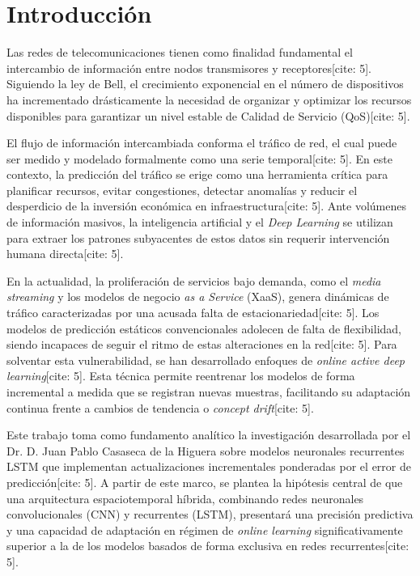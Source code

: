 \section{Introducción}
\label{cap:introduccion}

Las redes de telecomunicaciones tienen como finalidad fundamental el intercambio de información entre nodos transmisores y receptores[cite: 5]. Siguiendo la ley de Bell, el crecimiento exponencial en el número de dispositivos ha incrementado drásticamente la necesidad de organizar y optimizar los recursos disponibles para garantizar un nivel estable de Calidad de Servicio (QoS)[cite: 5]. 

El flujo de información intercambiada conforma el tráfico de red, el cual puede ser medido y modelado formalmente como una serie temporal[cite: 5]. En este contexto, la predicción del tráfico se erige como una herramienta crítica para planificar recursos, evitar congestiones, detectar anomalías y reducir el desperdicio de la inversión económica en infraestructura[cite: 5]. Ante volúmenes de información masivos, la inteligencia artificial y el \textit{Deep Learning} se utilizan para extraer los patrones subyacentes de estos datos sin requerir intervención humana directa[cite: 5].

En la actualidad, la proliferación de servicios bajo demanda, como el \textit{media streaming} y los modelos de negocio \textit{as a Service} (XaaS), genera dinámicas de tráfico caracterizadas por una acusada falta de estacionariedad[cite: 5]. Los modelos de predicción estáticos convencionales adolecen de falta de flexibilidad, siendo incapaces de seguir el ritmo de estas alteraciones en la red[cite: 5]. Para solventar esta vulnerabilidad, se han desarrollado enfoques de \textit{online active deep learning}[cite: 5]. Esta técnica permite reentrenar los modelos de forma incremental a medida que se registran nuevas muestras, facilitando su adaptación continua frente a cambios de tendencia o \textit{concept drift}[cite: 5].

Este trabajo toma como fundamento analítico la investigación desarrollada por el Dr. D. Juan Pablo Casaseca de la Higuera sobre modelos neuronales recurrentes LSTM que implementan actualizaciones incrementales ponderadas por el error de predicción[cite: 5]. A partir de este marco, se plantea la hipótesis central de que una arquitectura espaciotemporal híbrida, combinando redes neuronales convolucionales (CNN) y recurrentes (LSTM), presentará una precisión predictiva y una capacidad de adaptación en régimen de \textit{online learning} significativamente superior a la de los modelos basados de forma exclusiva en redes recurrentes[cite: 5].

